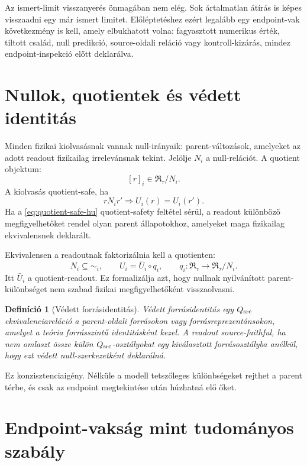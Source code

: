 \documentclass[12pt]{article}
\newtheorem{definition}{Definíció}
\newcommand{\RTspace}{\mathfrak R_{\tau}}
\begin{document}
Az ismert-limit visszanyerés önmagában nem elég.  Sok ártalmatlan átírás is
képes visszaadni egy már ismert limitet.  Előléptetéshez ezért legalább egy
endpoint-vak következmény is kell, amely elbukhatott volna: fagyasztott
numerikus érték, tiltott család, null predikció, source-oldali reláció vagy
kontroll-kizárás, mindez endpoint-inspekció előtt deklarálva.

\section{Nullok, quotientek és védett identitás}

Minden fizikai kiolvasásnak vannak null-irányaik: parent-változások, amelyeket
az adott readout fizikailag irrelevánsnak tekint.  Jelölje \(N_i\) a
null-relációt.  A quotient objektum:
\[
  [r]_i\in\RTspace/N_i.
\]
A kiolvasás quotient-safe, ha
\begin{equation}
  rN_i r'\Longrightarrow U_i(r)=U_i(r').
  \tag{QS-HU}
  \label{eq:quotient-safe-hu}
\end{equation}
Ha a \eqref{eq:quotient-safe-hu} quotient-safety feltétel sérül, a readout
különböző megfigyelhetőket rendel olyan parent
állapotokhoz, amelyeket maga fizikailag ekvivalensnek deklarált.

Ekvivalensen a readoutnak faktorizálnia kell a quotienten:
\[
  N_i\subseteq\sim_i,\qquad
  U_i=\bar U_i\circ q_i,\qquad
  q_i:\RTspace\to\RTspace/N_i.
\]
Itt \(\bar U_i\) a quotient-readout.  Ez formalizálja azt, hogy nullnak
nyilvánított parent-különbséget nem szabad fizikai megfigyelhetőként
visszaolvasni.

\begin{definition}[Védett forrásidentitás]
Védett forrásidentitás egy \(Q_{\rm src}\) ekvivalenciareláció a parent-oldali
forrásokon vagy forrásreprezentánsokon, amelyet a teória forrásszintű
identitásként kezel.  A readout source-faithful, ha nem omlaszt össze külön
\(Q_{\rm src}\)-osztályokat egy kiválasztott forrásosztályba anélkül, hogy ezt
védett null-szerkezetként deklarálná.
\end{definition}

Ez konzisztenciaigény.  Nélküle a modell tetszőleges különbségeket rejthet a
parent térbe, és csak az endpoint megtekintése után húzhatná elő őket.

\section{Endpoint-vakság mint tudományos szabály}
\end{document}
